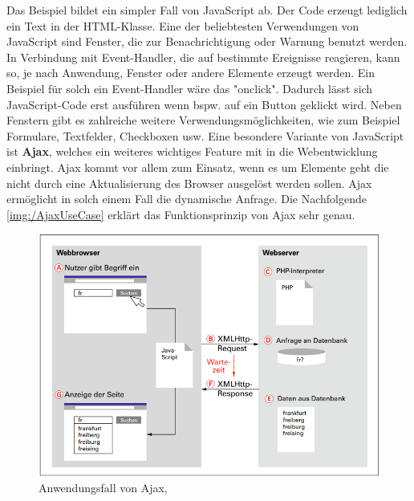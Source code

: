 \documentclass[a4paper,titlepage,halfparskip,12pt]{scrreprt}
\begin{document}
\begin{onehalfspacing}
Das Beispiel bildet ein simpler Fall von JavaScript ab. Der Code erzeugt lediglich ein Text in der HTML-Klasse. Eine der beliebtesten Verwendungen von JavaScript sind Fenster, die zur Benachrichtigung oder Warnung benutzt werden. In Verbindung mit Event-Handler, die auf bestimmte Ereignisse reagieren, kann so, je nach Anwendung, Fenster oder andere Elemente erzeugt werden. Ein Beispiel für solch ein Event-Handler wäre das "onclick". Dadurch lässt sich JavaScript-Code erst ausführen wenn bspw. auf ein Button geklickt wird. Neben Fenstern gibt es zahlreiche weitere Verwendungsmöglichkeiten, wie zum Beispiel Formulare, Textfelder, Checkboxen usw. Eine besondere Variante von JavaScript ist \textbf{\ac{Ajax}}, welches ein weiteres wichtiges Feature mit in die Webentwicklung einbringt. \ac{Ajax} kommt vor allem zum Einsatz, wenn es um Elemente geht die nicht durch eine Aktualisierung des Browser ausgelöst werden sollen. \ac{Ajax} ermöglicht in solch einem Fall die dynamische Anfrage. Die Nachfolgende \autoref{img:/AjaxUseCase} erklärt das Funktionsprinzip von \ac{Ajax} sehr genau.
\begin{figure}[h]
	\centering
	\includegraphics[scale=1.0]{images/AjaxUseCase}
	\caption{Anwendungsfall von Ajax, \cite{buhler2018webtechnologien}} 
	\label{img:/AjaxUseCase}
\end{figure}

\end{onehalfspacing}
\end{document}
